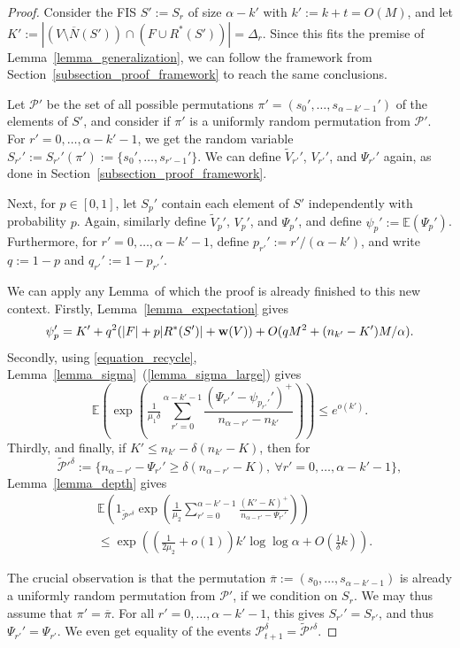 \documentclass{article}
\theoremstyle{plain}
\theoremstyle{remark}
\theoremstyle{plain}
\numberwithin{equation}{section}
\renewcommand{\b}{{\bf{w}}}
\begin{document}
	\begin{proof}
		Consider the FIS $S':=S_r$ of size $\alpha-k'$ with $k':=k+t=O(M)$, and let $K':=|(V\setminus\overline{N}(S'))\cap(F\cup R^*(S'))|=\Delta_r$. Since this fits the premise of Lemma~\ref{lemma_generalization}, we can follow the framework from Section~\ref{subsection_proof_framework} to reach the same conclusions.
		
		Let $\mathcal{P}'$ be the set of all possible permutations $\pi'=(s_0',\ldots,s_{\alpha-k'-1}')$ of the elements of $S'$, and consider if $\pi'$ is a uniformly random permutation from $\mathcal{P}'$. For $r'=0,\ldots,\alpha-k'-1$, we get the random variable $S_{r'}':=S_{r'}'(\pi'):=\{s_0',\ldots,s_{r'-1}'\}$. We can define $\widetilde{V}_{r'}'$, $V_{r'}'$, and $\Psi_{r'}'$ again, as done in Section~\ref{subsection_proof_framework}.
		
		Next, for $p\in[0,1]$, let $S_p'$ contain each element of $S'$ independently with probability $p$. Again, similarly define $\widetilde{V}_p'$, $V_p'$, and $\Psi_p'$, and define $\psi_p':=\mathbb{E}(\Psi_p')$. Furthermore, for $r'=0,\ldots,\alpha-k'-1$, define $p_{r'}':=r'/(\alpha-k')$, and write $q:=1-p$ and $q_{r'}':=1-p_{r'}'$.
		
		We can apply any Lemma~of which the proof is already finished to this new context. Firstly, Lemma~\ref{lemma_expectation} gives $$\psi_p'=K'+q^2(|F|+p|R^*(S')|+\b(V))+O(qM^2+(n_{k'}-K')M/\alpha).$$ Secondly, using \eqref{equation_recycle}, Lemma~\ref{lemma_sigma}~(\ref{lemma_sigma_large}) gives $$\mathbb{E}\left(\exp\left(\tfrac{1}{\mu_1\delta}\sum_{r'=0}^{\alpha-k'-1}\frac{(\Psi_{r'}'-\psi_{p_{r'}'}')^+}{n_{\alpha-r'}-n_{k'}}\right)\right)\leq e^{o(k')}.$$ Thirdly, and finally, if $K'\leq n_{k'}-\delta(n_{k'}-K)$, then for $$\widetilde{\mathcal{P}}'^{\delta}:=\{n_{\alpha-r'}-\Psi_{r'}'\geq\delta(n_{\alpha-r'}-K),\ \forall r'=0,\ldots,\alpha-k'-1\},$$ Lemma~\ref{lemma_depth} gives
		\begin{align}
			&\mathbb{E}\left(1_{\widetilde{\mathcal{P}}'^{\delta}}\exp\left(\tfrac1{\mu_2}\sum_{r'=0}^{\alpha-k'-1}\frac{(K'-K)^+}{n_{\alpha-r'}-\Psi_{r'}'}\right)\right)
			\\&\leq\exp\left((\tfrac{1}{2\mu_2}+o(1))k'\log\log\alpha+O(\tfrac1{\delta}k)\right).
		\end{align}
		
		The crucial observation is that the permutation $\overline{\pi}:=(s_0,\ldots,s_{\alpha-k'-1})$ is already a uniformly random permutation from $\mathcal{P}'$, if we condition on $S_r$. We may thus assume that $\pi'=\overline{\pi}$. For all $r'=0,\ldots,\alpha-k'-1$, this gives $S_{r'}'=S_{r'}$, and thus $\Psi_{r'}'=\Psi_{r'}$. We even get equality of the events $\mathcal{P}_{t+1}^{\delta}=\widetilde{\mathcal{P}}'^{\delta}$.
		

\end{proof}
\end{document}
